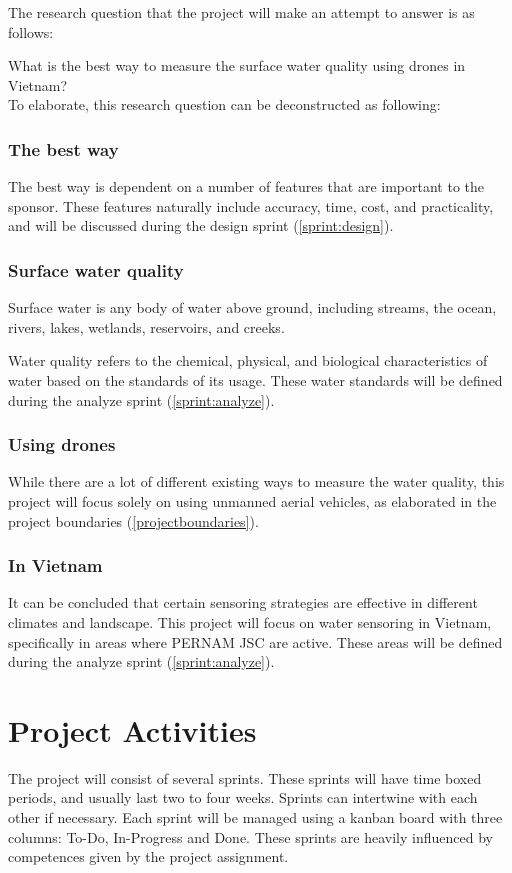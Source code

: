 \documentclass[11pt, a4paper]{article}
\begin{document}
The research question that the project will make an attempt to answer is as follows:\vspace{3mm}

\large{What is the best way to measure the surface water quality using drones in Vietnam?}\vspace{3mm}\\
\normalsize
To elaborate, this research question can be deconstructed as following:
\subsubsection{The best way}
The best way is dependent on a number of features that are important to the sponsor. These features naturally include accuracy, time, cost, and practicality, and will be discussed during the design sprint (\ref{sprint:design}).

\subsubsection{Surface water quality}
Surface water is any body of water above ground, including streams, the ocean, rivers, lakes, wetlands, reservoirs, and creeks.\cite{surfacewater}

Water quality refers to the chemical, physical, and biological characteristics of water based on the standards of its usage. These water standards will be defined during the analyze sprint (\ref{sprint:analyze}).

\subsubsection{Using drones}
While there are a lot of different existing ways to measure the water quality, this project will focus solely on using unmanned aerial vehicles, as elaborated in the project boundaries (\ref{projectboundaries}).

\subsubsection{In Vietnam}
It can be concluded that certain sensoring strategies are effective in different climates and landscape. This project will focus on water sensoring in Vietnam, specifically in areas where PERNAM JSC are active. These areas will be defined during the analyze sprint (\ref{sprint:analyze}).

\section{Project Activities} \label{projectactivities}
The project will consist of several sprints. These sprints will have time boxed periods, and usually last two to four weeks. Sprints can intertwine with each other if necessary. Each sprint will be managed using a kanban \cite{kanban} board with three columns: To-Do, In-Progress and Done. These sprints are heavily influenced by competences given by the project assignment. \cite{assignmentform}
\end{document}

